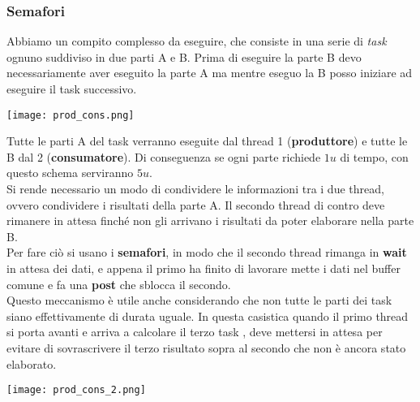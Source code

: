 \subsubsection{Semafori}
Abbiamo un compito complesso da eseguire, che consiste in una serie di \emph{task} ognuno suddiviso in due parti A e B. Prima di eseguire la parte B devo necessariamente aver eseguito la parte A ma mentre eseguo la B posso iniziare ad eseguire il task successivo.
\begin{center}
	\texttt{[image: prod\_cons.png]}
\end{center}
Tutte le parti A del task verranno eseguite dal thread 1 (\textbf{produttore}) e tutte le B dal 2 (\textbf{consumatore}). Di conseguenza se ogni parte richiede $1u$ di tempo, con questo schema serviranno $5u$.\\
Si rende necessario un modo di condividere le informazioni tra i due thread, ovvero condividere i risultati della parte A. Il secondo thread di contro deve rimanere in attesa finché non gli arrivano i risultati da poter elaborare nella parte B.\\
Per fare ciò si usano i \textbf{semafori}, in modo che il secondo thread rimanga in \textbf{wait} in attesa dei dati, e appena il primo ha finito di lavorare mette i dati nel buffer comune e fa una \textbf{post} che sblocca il secondo.\\
Questo meccanismo è utile anche considerando che non tutte le parti dei task siano effettivamente di durata uguale. In questa casistica quando il primo thread si porta avanti e arriva a calcolare il terzo task , deve mettersi in attesa per evitare di sovrascrivere il terzo risultato sopra al secondo che non è ancora stato elaborato.
\begin{center}
	\texttt{[image: prod\_cons\_2.png]}
\end{center}
